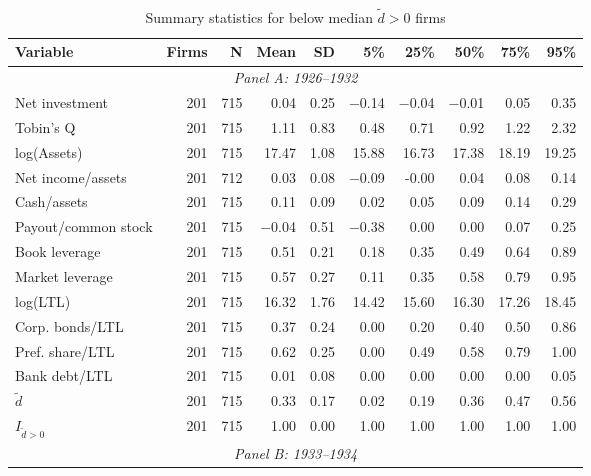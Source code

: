 \begin{table}[p]\centering
    \caption{\\ Summary statistics for below median $\tilde{d} > 0$ firms}\scriptsize
    \label{tabapp:summary_I_smalld}
    \begin{threeparttable}
        \begin{tabular}{lrrrrrrrrr}
            \toprule
            Variable & Firms & N & Mean & SD & 5\% & 25\% & 50\% & 75\% & 95\% \\
            \midrule
            \multicolumn{10}{c}{\textit{Panel A: 1926--1932}} \\
            \midrule
            Net investment & 201 & 715 & 0.04 & 0.25 & $-$0.14 & $-$0.04 & $-$0.01 & 0.05 & 0.35 \\
            Tobin's Q & 201 & 715 & 1.11 & 0.83 & 0.48 & 0.71 & 0.92 & 1.22 & 2.32 \\
            log(Assets) & 201 & 715 & 17.47 & 1.08 & 15.88 & 16.73 & 17.38 & 18.19 & 19.25 \\
            Net income/assets & 201 & 712 & 0.03 & 0.08 & $-$0.09 & -0.00 & 0.04 & 0.08 & 0.14 \\
            Cash/assets & 201 & 715 & 0.11 & 0.09 & 0.02 & 0.05 & 0.09 & 0.14 & 0.29 \\
            Payout/common stock & 201 & 715 & $-$0.04 & 0.51 & $-$0.38 & 0.00 & 0.00 & 0.07 & 0.25 \\
            Book leverage & 201 & 715 & 0.51 & 0.21 & 0.18 & 0.35 & 0.49 & 0.64 & 0.89 \\
            Market leverage & 201 & 715 & 0.57 & 0.27 & 0.11 & 0.35 & 0.58 & 0.79 & 0.95 \\
            log(LTL) & 201 & 715 & 16.32 & 1.76 & 14.42 & 15.60 & 16.30 & 17.26 & 18.45 \\
            Corp. bonds/LTL & 201 & 715 & 0.37 & 0.24 & 0.00 & 0.20 & 0.40 & 0.50 & 0.86 \\
            Pref. share/LTL & 201 & 715 & 0.62 & 0.25 & 0.00 & 0.49 & 0.58 & 0.79 & 1.00 \\
            Bank debt/LTL & 201 & 715 & 0.01 & 0.08 & 0.00 & 0.00 & 0.00 & 0.00 & 0.05 \\
            \ensuremath{\tilde{d}} & 201 & 715 & 0.33 & 0.17 & 0.02 & 0.19 & 0.36 & 0.47 & 0.56 \\
            \ensuremath{I_{\tilde{d}>0}} & 201 & 715 & 1.00 & 0.00 & 1.00 & 1.00 & 1.00 & 1.00 & 1.00 \\
            \midrule
            \multicolumn{10}{c}{\textit{Panel B: 1933--1934}} \\

\end{tabular}
\end{threeparttable}
\end{table}
